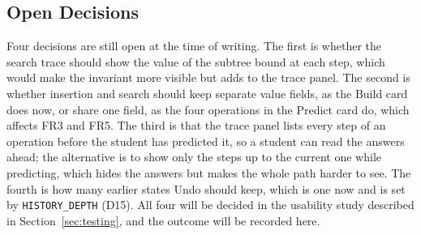 \subsection{Open Decisions}
Four decisions are still open at the time of writing. The first is whether the search trace should show the value of the subtree bound at each step, which would make the invariant more visible but adds to the trace panel. The second is whether insertion and search should keep separate value fields, as the Build card does now, or share one field, as the four operations in the Predict card do, which affects FR3 and FR5. The third is that the trace panel lists every step of an operation before the student has predicted it, so a student can read the answers ahead; the alternative is to show only the steps up to the current one while predicting, which hides the answers but makes the whole path harder to see. The fourth is how many earlier states Undo should keep, which is one now and is set by \texttt{HISTORY\_DEPTH} (D15). All four will be decided in the usability study described in Section~\ref{sec:testing}, and the outcome will be recorded here.
